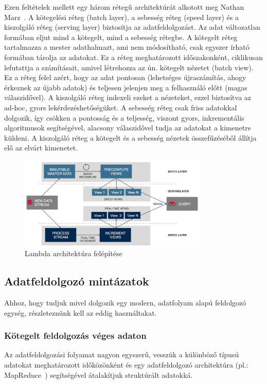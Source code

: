 \documentclass[a4paper,12pt]{article}
\begin{document}
Ezen feltételek mellett egy három rétegű architektúrát alkotott meg Nathan Marz~\cite{lambda}. A kötegelési réteg (batch layer), a sebesség réteg (speed layer) és a kiszolgáló réteg (serving layer) biztosítja az adatfeldolgozást. Az adat változatlan formában eljut mind a kötegelt, mind a sebesség rétegbe. A kötegelt réteg tartalmazza a mester adathalmazt, ami nem módosítható, csak egyszer írható formában tárolja az adatokat. Ez a réteg meghatározott időszakonként, ciklikusan lefutattja a számításait, amivel létrehozza az ún. kötegelt nézetet (batch view). Ez a réteg felel azért, hogy az adat pontosan (lehetséges újraszámítás, ahogy érkeznek az újabb adatok) és teljesen jelenjen meg a felhasználó előtt (magas válaszidővel).  A kiszolgáló réteg indexeli ezeket a nézeteket, ezzel biztosítva az ad-hoc, gyors lekérdezéshetőségüket. \linebreak
A sebesség réteg csak friss adatokkal dolgozik, így csökken a pontosság és a teljesség, viszont gyors, inkrementális algoritmusok segítségével, alacsony válaszidővel tudja az adatokat a kimenetre küldeni. A kiszolgáló réteg a kötegelt és a sebesség nézetek összefűzéséből állítja elő az elvárt kimenetet.

\begin{figure}[ht!]
\centering
\includegraphics[width=90mm]{img/lambda.png}
\caption{Lambda architektúra felépítése \label{lambda}}
\end{figure}


\subsection{Adatfeldolgozó mintázatok}
Ahhoz, hogy tudjuk mivel dolgozik egy modern, adatfolyam alapú feldolgozó egység, részleteznünk kell az eddig használtakat.

\subsubsection{Kötegelt feldolgozás véges adaton}
Az adatfeldolgozási folyamat nagyon egyszerű, vesszük a különböző típusú adatokat meghatározott időközönként és egy adatfeldolgozó architektúra (pl.: MapReduce~\cite{mapreduce}) segítségével átalakítjuk struktúrált adatokká.
\end{document}
